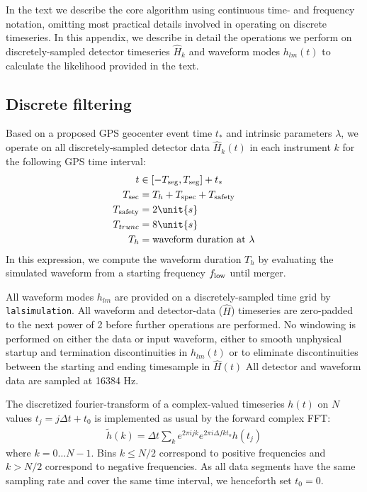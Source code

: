 \label{ap:DiscreteData}

In the text we describe the core algorithm using continuous time- and frequency notation, omitting most practical
details involved in operating on discrete timeseries.  In this appendix, we describe in detail the operations we perform
on discretely-sampled detector timeseries $\hat{H}_k$  and  waveform modes $h_{lm}(t)$ to calculate the likelihood
provided in the text.

\subsection{Discrete filtering}

Based on a proposed GPS geocenter event time $t_*$ and intrinsic parameters $\lambda$, we operate on all discretely-sampled detector
data $\hat{H}_k(t)$  in each instrument $k$ for the following GPS time interval:
\begin{align}
t &\in [-T_{\rm seg},T_{\rm seg}]+t_{*} \\
T_{\rm sec} &= T_h+T_{\rm spec} +T_{\rm safety} \\
T_{\rm safety} &= 2\unit{s} \\
 T_{trunc} &= 8 \unit{s} \\
T_h &= \text{waveform duration at }\lambda
\end{align}
In this expression, we compute the waveform duration $T_h$ by evaluating the simulated waveform from a starting
frequency $f_{\rm low}$ until merger. 

All waveform modes $h_{lm}$ are provided on a discretely-sampled time grid by \texttt{lalsimulation}.  
%
All waveform and detector-data ($\hat{H}$) timeseries are zero-padded to the next power of 2 before further operations are
performed.  
%
No windowing is performed on either the data or input waveform, either to smooth unphysical startup and termination
discontinuities in $h_{lm}(t)$ or to eliminate discontinuities between the starting and ending timesample in $\hat{H}(t)$
%
All detector and waveform data are sampled at 16384 Hz.  
%


The discretized fourier-transform of a complex-valued timeseries $h(t)$ on $N$  values $t_j=j\Delta t+t_0$ is
implemented as usual by the forward complex FFT:
\begin{eqnarray}
\tilde{h}(k) = \Delta t  \sum_k e^{2\pi i j k} e^{2\pi i \Delta f k t_o} h(t_j)
\end{eqnarray}
where $k=0\ldots N-1$.  Bins $k\le N/2$ correspond to positive frequencies and $k>N/2$ correspond to  negative
frequencies.    As all data segments  have the same sampling rate and cover the same time interval, we henceforth set $t_0=0$.  
% 


